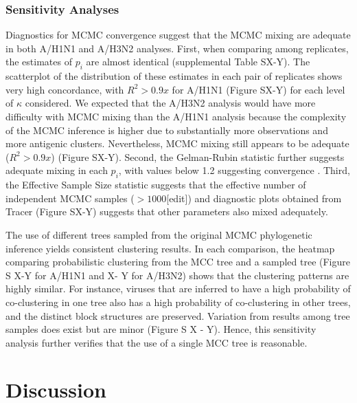 \documentclass[11pt,oneside,letterpaper]{article}
\begin{document}
\subsubsection*{Sensitivity Analyses}

Diagnostics for MCMC convergence suggest that the MCMC mixing are adequate in both A/H1N1 and A/H3N2 analyses. 
First, when comparing among replicates, the estimates of $p_i$ are almost identical (supplemental Table SX-Y). 
The scatterplot of the distribution of these estimates in each pair of replicates shows very high concordance, with $R^2 > 0.9x$  for A/H1N1 (Figure SX-Y) for each level of $\kappa$ considered. 
We expected that the A/H3N2 analysis would have more difficulty with MCMC mixing than the A/H1N1 analysis because the complexity of the MCMC inference is higher due to substantially more observations and more antigenic clusters. 
Nevertheless, MCMC mixing still appears to be adequate ($R^2 > 0.9x$) (Figure SX-Y). 
Second, the Gelman-Rubin statistic further suggests adequate mixing in each $p_i$, with values below 1.2  suggesting convergence \cite{Yang_evolutionbook}. 
Third, the Effective Sample Size statistic suggests that the effective number of independent MCMC samples ($>1000$[edit]) and diagnostic plots obtained from Tracer (Figure SX-Y) suggests that other parameters also mixed adequately.

The use of different trees sampled from the original MCMC phylogenetic inference yields consistent clustering results. In each comparison, the heatmap comparing probabilistic clustering from the MCC tree and a sampled tree (Figure S X-Y  for A/H1N1 and X- Y for A/H3N2) shows that the clustering patterns are highly similar. 
For instance, viruses that are inferred to have a high probability of co-clustering in one tree also has a high probability of co-clustering in other trees, and the distinct block structures are preserved. 
Variation from results among tree samples does exist but are minor (Figure S X - Y). 
Hence, this sensitivity analysis further verifies that the use of a single MCC tree is reasonable.




\newpage

\section*{Discussion}
\end{document}
